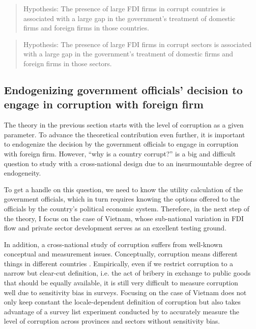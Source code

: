 \begin{quote}
Hypothesis: The presence of large FDI firms in corrupt countries is associated with a large gap in the government's treatment of domestic firms and foreign firms in those countries.
\end{quote}

\begin{quote}
Hypothesis: The presence of large FDI firms in corrupt sectors is associated with a large gap in the government's treatment of domestic firms and foreign firms in those sectors.
\end{quote}

\subsection{Endogenizing government officials' decision to engage in corruption with foreign firm}

The theory in the previous section starts with the level of corruption as a given parameter. To advance the theoretical contribution even further, it is important to endogenize the decision by the government officials to engage in corruption with foreign firm. However, ``why is a country corrupt?'' is a big and difficult question to study with a cross-national design due to an insurmountable degree of endogeneity. 

To get a handle on this question, we need to know the utility calculation of the government officials, which in turn requires knowing the options offered to the officials by the country's political economic system. Therefore, in the next step of the theory, I focus on the case of Vietnam, whose sub-national variation in FDI flow and private sector development serves as an excellent testing ground.

In addition, a cross-national study of corruption suffers from well-known conceptual and measurement issues. Conceptually, corruption means different things in different countries \citep{Rosen2010}. Empirically, even if we restrict corruption to a narrow but clear-cut definition, i.e. the act of bribery in exchange to public goods that should be equally available, it is still very difficult to measure corruption well due to sensitivity bias in surveys. Focusing on the case of Vietnam does not only keep constant the locale-dependent definition of corruption but also takes advantage of a survey list experiment conducted by \citet{Malesky2015} to accurately measure the level of corruption across provinces and sectors without sensitivity bias.

